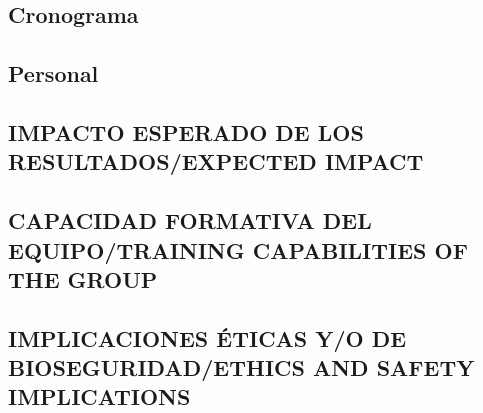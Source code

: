 \documentclass[a4paper,11pt,oneside]{article}
\begin{document}
%

\subsection*{\sc Cronograma}

%



\subsection*{\sc Personal}



\subsection{\sc IMPACTO ESPERADO DE LOS RESULTADOS/EXPECTED IMPACT}

%

\subsection{\sc CAPACIDAD FORMATIVA DEL EQUIPO/TRAINING CAPABILITIES OF THE GROUP}






\subsection{\sc IMPLICACIONES ÉTICAS Y/O DE BIOSEGURIDAD/ETHICS AND SAFETY IMPLICATIONS}
\end{document}
